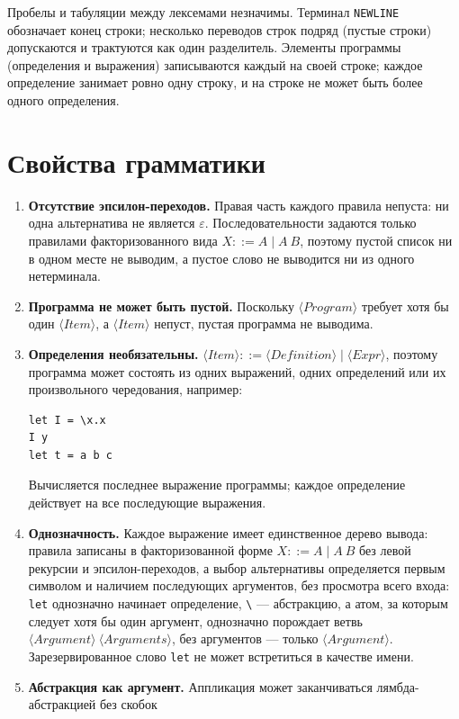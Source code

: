 \documentclass{article}
\begin{document}
Пробелы и табуляции между лексемами незначимы. Терминал \texttt{NEWLINE} обозначает конец строки; несколько переводов строк подряд (пустые строки) допускаются и трактуются как один разделитель. Элементы программы (определения и выражения) записываются каждый на своей строке; каждое определение занимает ровно одну строку, и на строке не может быть более одного определения.

\section{Свойства грамматики}

\begin{enumerate}
    \item \textbf{Отсутствие эпсилон-переходов.} Правая часть каждого правила непуста: ни одна альтернатива не является $\varepsilon$. Последовательности задаются только правилами факторизованного вида $X ::= A \mid A \ B$, поэтому пустой список ни в одном месте не выводим, а пустое слово не выводится ни из одного нетерминала.
    \item \textbf{Программа не может быть пустой.} Поскольку $\langle Program \rangle$ требует хотя бы один $\langle Item \rangle$, а $\langle Item \rangle$ непуст, пустая программа не выводима.
    \item \textbf{Определения необязательны.} $\langle Item \rangle ::= \langle Definition \rangle \mid \langle Expr \rangle$, поэтому программа может состоять из одних выражений, одних определений или их произвольного чередования, например:
    \begin{verbatim}
let I = \x.x
I y
let t = a b c
    \end{verbatim}
    Вычисляется последнее выражение программы; каждое определение действует на все последующие выражения.
    \item \textbf{Однозначность.} Каждое выражение имеет единственное дерево вывода: правила записаны в факторизованной форме $X ::= A \mid A \ B$ без левой рекурсии и эпсилон-переходов, а выбор альтернативы определяется первым символом и наличием последующих аргументов, без просмотра всего входа: \texttt{let} однозначно начинает определение, \texttt{\textbackslash} --- абстракцию, а атом, за которым следует хотя бы один аргумент, однозначно порождает ветвь $\langle Argument \rangle \ \langle Arguments \rangle$, без аргументов --- только $\langle Argument \rangle$. Зарезервированное слово \texttt{let} не может встретиться в качестве имени.
    \item \textbf{Абстракция как аргумент.} Аппликация может заканчиваться лямбда-абстракцией без скобок

\end{enumerate}
\end{document}
